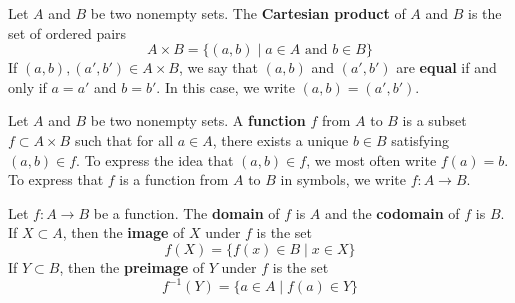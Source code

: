 \documentclass[../main.tex]{subfiles}
\begin{document}
\setcounter{theorem}{14}

\begin{definition}\label{dfn:1.15}
    Let $A$ and $B$ be two nonempty sets. The \textbf{Cartesian product} of $A$ and $B$ is the set of ordered pairs
    \begin{equation*}
        A\times B = \{(a,b)\mid a\in A\text{ and }b\in B\}
    \end{equation*}
    If $(a,b),(a',b')\in A\times B$, we say that $(a,b)$ and $(a',b')$ are \textbf{equal} if and only if $a=a'$ and $b=b'$. In this case, we write $(a,b)=(a',b')$.
\end{definition}

\begin{definition}\label{dfn:1.16}
    Let $A$ and $B$ be two nonempty sets. A \textbf{function} $f$ from $A$ to $B$ is a subset $f\subset A\times B$ such that for all $a\in A$, there exists a unique $b\in B$ satisfying $(a,b)\in f$. To express the idea that $(a,b)\in f$, we most often write $f(a)=b$. To express that $f$ is a function from $A$ to $B$ in symbols, we write $f:A\to B$.
\end{definition}


\begin{definition}\label{dfn:1.18}
    Let $f:A\to B$ be a function. The \textbf{domain} of $f$ is $A$ and the \textbf{codomain} of $f$ is $B$. If $X\subset A$, then the \textbf{image} of $X$ under $f$ is the set
    \begin{equation*}
        f(X) = \{f(x)\in B\mid x\in X\}
    \end{equation*}
    If $Y\subset B$, then the \textbf{preimage} of $Y$ under $f$ is the set
    \begin{equation*}
        f^{-1}(Y) = \{a\in A\mid f(a)\in Y\}
    \end{equation*}
\end{definition}
\end{document}
